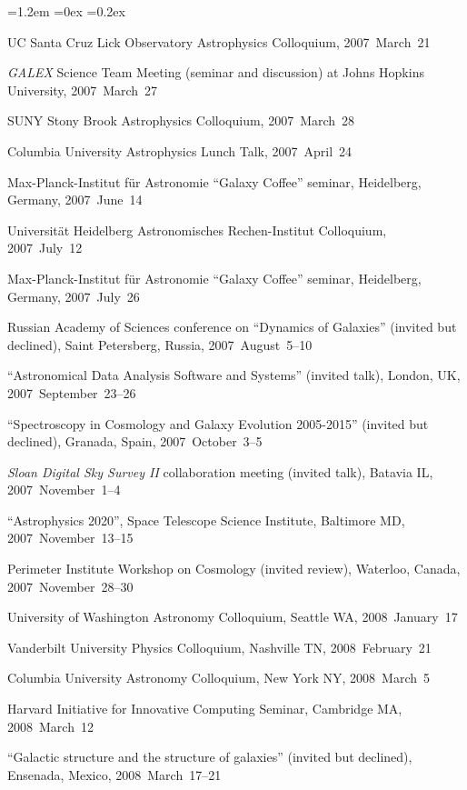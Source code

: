 \documentclass[10pt,letterpaper]{article}
\newcommand{\acronym}[1]{{\small{#1}}}
\newcommand{\project}[1]{\textsl{#1}}
\newcounter{refpubnum}
\newcommand{\hogglist}{%
    \rightmargin=0in
    \leftmargin=1.2em
    \topsep=0ex
    \partopsep=0pt
    \itemsep=0.2ex
    \parsep=0pt
    \itemindent=-1.0\leftmargin
    \listparindent=0.0\leftmargin
    \settowidth{\labelsep}{~}
    \usecounter{refpubnum}
  }
\begin{document}
\begin{list}{}{\hogglist}
{\item UC Santa Cruz Lick Observatory Astrophysics Colloquium, 2007~March~21
\item \project{\acronym{GALEX}} Science Team Meeting (seminar and discussion) at Johns Hopkins University, 2007~March~27
\item SUNY Stony Brook Astrophysics Colloquium, 2007~March~28
\item Columbia University Astrophysics Lunch Talk, 2007~April~24
\item Max-Planck-Institut f\"ur Astronomie ``Galaxy Coffee'' seminar, Heidelberg, Germany, 2007~June~14
\item Universit\"at Heidelberg Astronomisches Rechen-Institut Colloquium,
          2007~July~12
\item Max-Planck-Institut f\"ur Astronomie ``Galaxy Coffee'' seminar,
          Heidelberg, Germany,
          2007~July~26
\item Russian Academy of Sciences conference on ``Dynamics of Galaxies''
          (invited but declined), Saint Petersberg, Russia,
          2007~August~5--10
\item ``Astronomical Data Analysis Software and Systems'' (invited talk),
          London, UK, 2007~September~23--26
\item ``Spectroscopy in Cosmology and Galaxy Evolution 2005-2015''
          (invited but declined), Granada, Spain, 2007~October~3--5
\item \project{Sloan Digital Sky Survey II} collaboration meeting (invited talk),
          Batavia IL, 2007~November~1--4
\item ``Astrophysics 2020'', Space Telescope Science Institute,
          Baltimore MD, 2007~November~13--15
\item Perimeter Institute Workshop on Cosmology (invited review),
          Waterloo, Canada, 2007~November~28--30
\item University of Washington Astronomy Colloquium,
          Seattle WA, 2008~January~17
\item Vanderbilt University Physics Colloquium,
          Nashville TN, 2008~February~21
\item Columbia University Astronomy Colloquium,
          New York NY, 2008~March~5
\item Harvard Initiative for Innovative Computing Seminar,
          Cambridge MA, 2008~March~12
\item ``Galactic structure and the structure of galaxies''
          (invited but declined), Ensenada, Mexico, 2008~March~17--21
}
\end{list}
\end{document}
